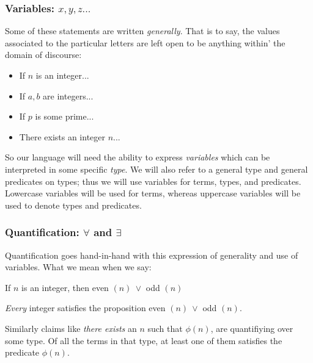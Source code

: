 \documentclass{beamer}
\theoremstyle{indentDefn} \newtheorem{defn}[]{Definition}
\begin{document}
\begin{frame}
	\frametitle{Variables: $x,y,z...$}
	
	Some of these statements are written \emph{generally}. That is to say, the values associated to the particular letters are left open to be anything within' the domain of discourse: 
	
	\vspace{0.2cm}
	
	\begin{itemize}
		\item If $n$ is an integer...
		\item If $a,b$ are integers...
		\item If $p$ is some prime...
		\item There exists an integer $n$...
	\end{itemize}

	\vspace{0.2cm}
	
	So our language will need the ability to express \emph{variables} which can be interpreted in some specific \emph{type}. We will also refer to a general type and general predicates on types; thus we will use variables for terms, types, and predicates. Lowercase variables will be used for terms, whereas uppercase variables will be used to denote types and predicates. 
\end{frame}

\begin{frame}
	\frametitle{Quantification: $\forall$ and $\exists$}
	
	Quantification goes hand-in-hand with this expression of generality and use of variables. What we mean when we say: 
	
	\begin{center}
		If $n$ is an integer, then even $(n) \ \lor $ odd $(n)$ 
	\end{center}

	\emph{Every} integer satisfies the proposition even $(n) \ \lor $ odd $(n)$.
	
	\vspace{0.5cm} 
	
	Similarly claims like \emph{there exists} an $n$ such that $\phi(n)$, are quantifiying over some type. Of all the terms in that type, at least one of them satisfies the predicate $\phi(n)$. 
	
\end{frame}
\end{document}
